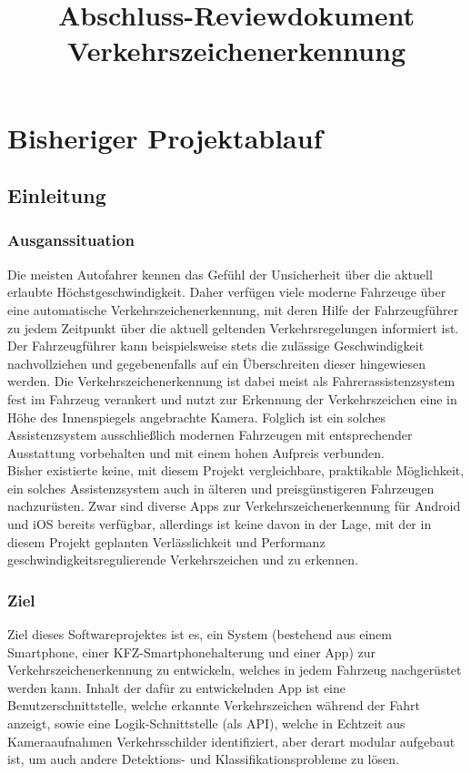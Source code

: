 \documentclass[12pt,a4paper,ngerman,enabledeprecatedfontcommands]{scrreprt}
\title{Abschluss-Reviewdokument\\Verkehrszeichenerkennung}
\begin{document}
\maketitle
\renewcommand{\arraystretch}{1.5}
\tableofcontents


\part{Bisheriger Projektablauf}

\chapter{Einleitung}

\section{Ausganssituation}
Die meisten Autofahrer kennen das Gefühl der Unsicherheit über die aktuell erlaubte Höchstgeschwindigkeit. Daher verfügen viele moderne Fahrzeuge über eine automatische Verkehrszeichenerkennung, mit deren Hilfe der Fahrzeugführer zu jedem Zeitpunkt über die aktuell geltenden Verkehrsregelungen informiert ist. Der Fahrzeugführer kann beispielsweise stets die zulässige Geschwindigkeit nachvollziehen und gegebenenfalls auf ein Überschreiten dieser hingewiesen werden. Die Verkehrszeichenerkennung ist dabei meist als Fahrerassistenzsystem fest im \gls{Fahrzeug} verankert und nutzt zur Erkennung der Verkehrszeichen eine in Höhe des Innenspiegels angebrachte Kamera. Folglich ist ein solches Assistenzsystem ausschließlich modernen Fahrzeugen mit entsprechender Ausstattung vorbehalten und mit einem hohen Aufpreis verbunden.\\

Bisher existierte keine, mit diesem Projekt vergleichbare, praktikable Möglichkeit, ein solches Assistenzsystem auch in älteren und preisgünstigeren Fahrzeugen nachzurüsten. Zwar sind diverse Apps zur Verkehrszeichenerkennung für Android und iOS bereits verfügbar, allerdings ist keine davon in der Lage, mit der in diesem Projekt geplanten Verlässlichkeit und Performanz geschwindigkeitsregulierende Verkehrszeichen und  zu erkennen.\\


\section{Ziel}
Ziel dieses Softwareprojektes ist es, ein \gls{System} (bestehend aus einem \gls{Smartphone}, einer KFZ-Smartphonehalterung und einer \gls{App}) zur Verkehrszeichenerkennung zu entwickeln,
welches in jedem \gls{Fahrzeug} nachgerüstet werden kann. Inhalt der dafür zu entwickelnden \gls{App} ist eine Benutzerschnittstelle, welche erkannte Verkehrszeichen während der Fahrt anzeigt, sowie eine Logik-Schnittstelle (als \gls{API}), welche in Echtzeit aus Kameraaufnahmen Verkehrsschilder identifiziert, aber derart modular aufgebaut ist, um auch andere \gls{Detektion}s- und \gls{Klassifikation}sprobleme zu lösen.\\
\end{document}
